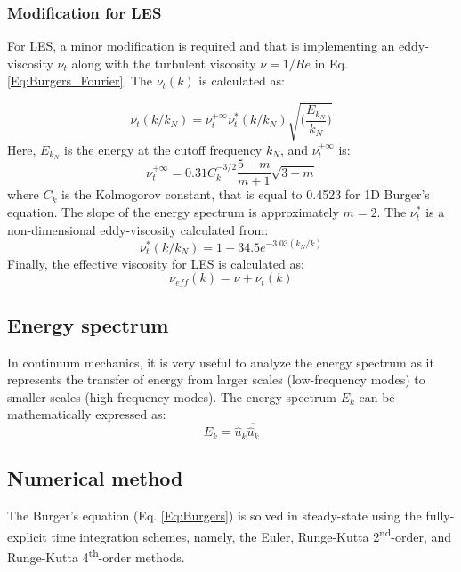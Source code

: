 \documentclass[a4paper]{article}
\begin{document}
\subsubsection{Modification for LES}
For LES, a minor modification is required and that is implementing an eddy-viscosity $\nu_t$ along with the turbulent viscosity $\nu = 1/Re$ in Eq. \ref{Eq:Burgers_Fourier}. The $\nu_t (k)$ is calculated as:

\begin{equation}
	\nu_t(k/k_N) = \nu_t^{+\infty} \nu_t^*(k/k_N) \sqrt{\bigg(\frac{E_{k_N}}{k_N} \bigg)}
	\label{Eq:eddy-viscosity}
\end{equation}
Here, $ E_{k_N} $ is the energy at the cutoff frequency $ k_N $, and $ \nu_t^{+\infty} $ is:
\begin{equation}
	\nu_t^{+\infty} = 0.31 C_k^{-3/2} \frac{5-m}{m+1} \sqrt{3-m}
	\label{Eq:nut_plus}
\end{equation}
where $ C_k $ is the Kolmogorov constant, that is equal to 0.4523 for 1D Burger's equation. The slope of the energy spectrum is approximately $ m=2 $. The $ \nu_t^* $ is a non-dimensional eddy-viscosity calculated from:
\begin{equation}
	\nu_t^*(k/k_N) = 1 + 34.5 e^{-3.03(k_N/k)}
	\label{Eq:nut_star}
\end{equation}
Finally, the effective viscosity for LES is calculated as:
\begin{equation}
	\nu_{eff}(k) = \nu + \nu_t(k)
	\label{Eq:nu_eff}
\end{equation}
\subsection{Energy spectrum}
In continuum mechanics, it is very useful to analyze the energy spectrum as it represents the transfer of energy from larger scales (low-frequency modes) to smaller scales (high-frequency modes). The energy spectrum $ E_k $ can be mathematically expressed as:
\begin{equation}
	E_k = \hat{u}_k \overline{\hat{u}_k}
	\label{Eq:Burgers_Fourier_Energy}
\end{equation}
\subsection{Numerical method}
The Burger's equation (Eq. \ref{Eq:Burgers}) is solved in steady-state using the fully-explicit time integration schemes, namely, the Euler, Runge-Kutta 2\textsuperscript{nd}-order, and Runge-Kutta 4\textsuperscript{th}-order methods.
\end{document}
